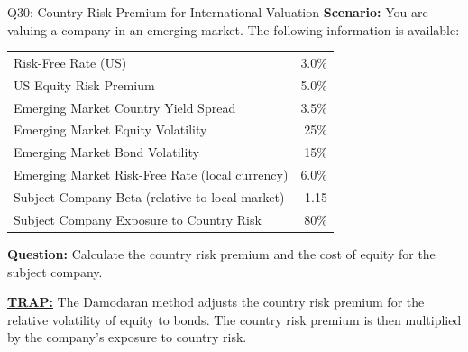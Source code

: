 \documentclass{beamer}
\renewcommand{\scriptsize}{\fontsize{6pt}{7pt}\selectfont}
\begin{document}
	\begin{frame}{Q30: Country Risk Premium for International Valuation}
		\scriptsize
		\textbf{Scenario:} You are valuing a company in an emerging market. The following information is available:
		
		\begin{tabular}{lr}
			Risk-Free Rate (US) & 3.0\% \\
			US Equity Risk Premium & 5.0\% \\
			Emerging Market Country Yield Spread & 3.5\% \\
			Emerging Market Equity Volatility & 25\% \\
			Emerging Market Bond Volatility & 15\% \\
			Emerging Market Risk-Free Rate (local currency) & 6.0\% \\
			Subject Company Beta (relative to local market) & 1.15 \\
			Subject Company Exposure to Country Risk & 80\% \\
		\end{tabular}
		
		\textbf{Question:} Calculate the country risk premium and the cost of equity for the subject company.
		
		\vspace{2pt}
		\underline{\textbf{TRAP:}} The Damodaran method adjusts the country risk premium for the relative volatility of equity to bonds. The country risk premium is then multiplied by the company's exposure to country risk.
	\end{frame}
	
\end{document}
